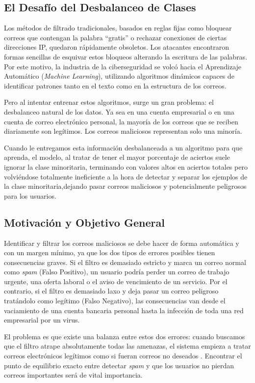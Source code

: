 \documentclass[a4paper,11pt]{book}
\begin{document}
\subsection{El Desafío del Desbalanceo de Clases}
Los métodos de filtrado tradicionales, basados en reglas fijas como bloquear correos que contengan la palabra ``gratis''  o rechazar conexiones de ciertas direcciones IP, quedaron rápidamente obsoletos. Los atacantes encontraron formas sencillas de esquivar estos bloqueos alterando la escritura de las palabras. Por este motivo, la industria de la ciberseguridad se volcó hacia el Aprendizaje Automático (\textit{Machine Learning}), utilizando algoritmos dinámicos capaces de identificar patrones  tanto en el texto como en la estructura de los correos. ~\cite{dada2019machine}

Pero al intentar entrenar  estos algoritmos, surge un gran problema: el desbalanceo natural de los datos. Ya sea en una cuenta empresarial o en una cuenta de correo electrónico personal, la  mayoría de los correos que se reciben diariamente son legítimos. Los correos  maliciosos representan solo una minoría. 

Cuando le entregamos esta información desbalanceada a un algoritmo  para que aprenda, el modelo, al tratar de tener el mayor porcentaje de aciertos suele ignorar la clase minoritaria, terminando con valores altos en aciertos totales pero volviéndose totalmente ineficiente a la hora de detectar y separar los ejemplos de la clase minoritaria,dejando pasar correos maliciosos y potencialmente peligrosos para los usuarios.

\subsection{Motivación y Objetivo General}
Identificar y filtrar los correos maliciosos se debe hacer de forma automática y con un margen mínimo, ya que los dos tipos de errores posibles tienen consecuencias graves. Si el filtro es demasiado estricto y marca un correo normal como \textit{spam} (Falso Positivo), un usuario podría perder un correo de trabajo urgente, una oferta laboral o el aviso de vencimiento de un servicio. Por el contrario, si el filtro es demasiado laxo y deja pasar un correo peligroso tratándolo como legítimo (Falso Negativo), las consecuencias van desde el vaciamiento de una cuenta bancaria personal hasta la infección de toda una red empresarial por un virus. 

El problema es que existe una balanza entre estos dos errores: cuando buscamos que el filtro  atrape absolutamente todas las amenazas, el sistema empieza a tratar correos electrónicos legítimos como si fueran correos no deseados . Encontrar el punto de equilibrio exacto entre detectar \textit{spam} y que los usuarios no pierdan correos importantes será de vital importancia.
\end{document}
